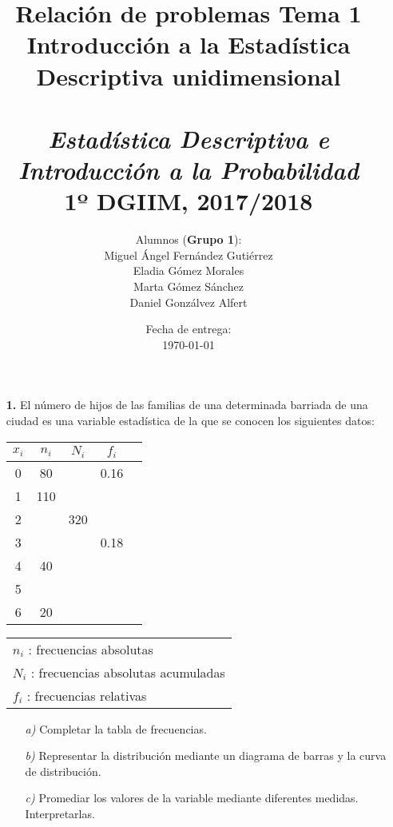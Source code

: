 \documentclass[11pt,a4paper]{article}
\title{%
  \textbf{Relación de problemas Tema 1} \\ Introducción a la Estadística Descriptiva unidimensional \\
  \hspace{1cm}\\
  \large \emph{Estadística Descriptiva e Introducción a la Probabilidad} \\
    1º DGIIM, 2017/2018}
\author{\small{Alumnos (\textbf{Grupo 1}):} \\
Miguel Ángel Fernández Gutiérrez \\
Eladia Gómez Morales \\
Marta Gómez Sánchez \\
Daniel Gonzálvez Alfert}
\date{\small{Fecha de entrega:} \\
\today}
\theoremstyle{definition}
\begin{document}
\maketitle

\hrulefill




\begin{itemize}
	\item[\textbf{1.}] El número de hijos de las familias de una determinada barriada de una ciudad es una variable estadística de la que se conocen los siguientes datos:	



\begin{table}[htb]
\hspace*{2 cm}
\begin{tabular}{|c|c|c|c|c|}
$x_i$ & $n_i$ & $N_i$ & $f_i$ \\ \hline
0 & 80 & & 0.16 \\
1 & 110 & & \\
2 & & 320 & \\
3 & & & 0.18 \\
4 & 40 & & \\
5 & & & \\
6 & 20 & & \\ \hline
\end{tabular}
\hspace*{1.5cm}
{
\begin{tabular}{l}
$n_i$ : frecuencias absolutas \\
$N_i$ : frecuencias absolutas acumuladas \\
$f_i$ : frecuencias relativas
\end{tabular}}

\end{table}

	\begin{itemize}
		\item[\emph{a)}] Completar la tabla de frecuencias.
		\item[\emph{b)}] Representar la distribución mediante un diagrama de barras y la curva de distribución.
		\item[\emph{c)}] Promediar los valores de la variable mediante diferentes medidas. Interpretarlas.
	\end{itemize}
\end{itemize}

{\color{grey}\hrulefill}
\end{document}
